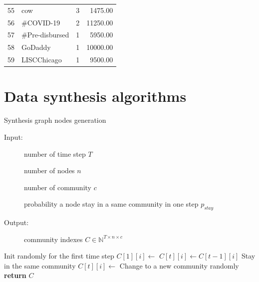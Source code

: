 \begin{longtable}{|c|l|r|r|}
	55          & cow                              & 3                      & 1475.00                      \\
	56          & \#COVID-19                       & 2                      & 11250.00                     \\
	57          & \#Pre-disbursed                  & 1                      & 5950.00                      \\
	58          & GoDaddy                          & 1                      & 10000.00                     \\
	59          & LISCChicago                      & 1                      & 9500.00                      \\
\end{longtable}

\chapter{Data synthesis algorithms}

\begin{algorithm}
	\noindent
	\caption{Synthesis graph nodes generation}
	\label{alg:appendix-synthesis_graph_nodes}
	\begin{description}
		\item[Input:] number of time step $T$
		\item[\phantom{Input:}] number of nodes $n$
		\item[\phantom{Input:}] number of community $c$
		\item[\phantom{Input:}] probability a node stay in a same community in one step $p_{stay}$
		\item[Output:] community indexes $C \in \mathbb{N}^{T \times n \times c}$
	\end{description}
	\begin{algorithmic}[1]
		\Comment Init randomly for the first time step
		\State $C[1][i] \gets$ 
		\EndFor
		\State $C[t][i] \gets C[t-1][i]$
		\Comment Stay in the same community
		\Else
		\State $C[t][i] \gets$ 
		\Comment Change to a new community randomly
		\EndIf
		\EndFor
		\EndFor
		\State \textbf{return} $C$
		\EndFunction
	\end{algorithmic}
\end{algorithm}


